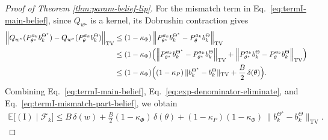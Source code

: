 \documentclass[10pt]{article} %
\theoremstyle{plain}
\theoremstyle{definition}
\theoremstyle{remark}
\newcommand{\bE}{\mathbb{E}}
\begin{document}
\begin{proof}[Proof of Theorem \ref{thm:param-belief-lip}]
For the mismatch term in Eq.~\ref{eq:termI-main-belief}, since \(Q_{w^\star}\) is a kernel, its Dobrushin contraction gives
\begin{align}\label{eq:termI-mismatch-part-belief}
\Big\|Q_{w^\star}(P_{\theta^\star}^{a_k}b_k^{\Theta^\star})-Q_{w^\star}(P_{\theta}^{a_k}b_k^{\Theta})\Big\|_{\mathrm{TV}}
&\le (1-\kappa_\Phi)\,\Big\|P_{\theta^\star}^{a_k}b_k^{\Theta^\star}-P_{\theta}^{a_k}b_k^{\Theta}\Big\|_{\mathrm{TV}}\notag\\
&\le (1-\kappa_\Phi)\Big(
\Big\|P_{\theta^\star}^{a_k}b_k^{\Theta^\star}-P_{\theta^\star}^{a_k}b_k^{\Theta}\Big\|_{\mathrm{TV}}
+\Big\|P_{\theta^\star}^{a_k}b_k^{\Theta}-P_{\theta}^{a_k}b_k^{\Theta}\Big\|_{\mathrm{TV}}
\Big)\notag\\
&\le (1-\kappa_\Phi)\Big(
(1-\kappa_P)\,\|b_k^{\Theta^\star}-b_k^{\Theta}\|_{\mathrm{TV}}
+\frac{B}{2}\,\delta(\theta)
\Big).
\end{align}
Combining Eq.~\ref{eq:termI-main-belief}, Eq.~\ref{eq:exp-denominator-eliminate}, and Eq.~\ref{eq:termI-mismatch-part-belief}, we obtain
\begin{align}\label{eq:I-final-bound-thm}
\bE\big[(\mathrm{I})\mid \mathcal F_k\big]
\le
B\,\delta(w)
+\frac{B}{2}(1-\kappa_\Phi)\,\delta(\theta)
+(1-\kappa_P)(1-\kappa_\Phi)\,\|b_k^{\Theta^\star}-b_k^{\Theta}\|_{\mathrm{TV}}.
\end{align}


\end{proof}
\end{document}

